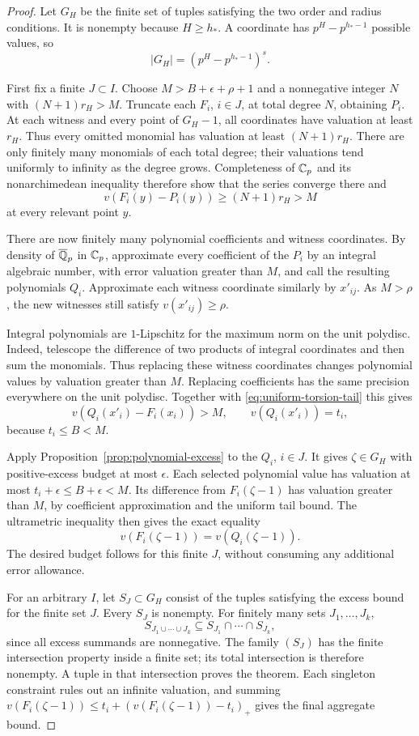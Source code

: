 \begin{proof}
Let $G_H$ be the finite set of tuples satisfying the two order and radius
conditions. It is nonempty because $H\ge h_*$. A coordinate has
$p^H-p^{h_*-1}$ possible values, so
\[
 |G_H|=(p^H-p^{h_*-1})^s.
\]

First fix a finite $J\subset I$. Choose
$M>B+\epsilon+\rho+1$ and a nonnegative integer $N$ with
$(N+1)r_H>M$. Truncate each $F_i$, $i\in J$, at total degree $N$,
obtaining $P_i$. At each witness and every point of $G_H-1$, all
coordinates have valuation at least $r_H$. Thus every omitted
monomial has valuation at least $(N+1)r_H$. There are only finitely
many monomials of each total degree; their valuations tend uniformly
to infinity as the degree grows. Completeness of $\mathbb C_p$ and its
nonarchimedean inequality therefore show that the series converge
there and
\begin{equation}
\label{eq:uniform-torsion-tail}
 v(F_i(y)-P_i(y))\ge(N+1)r_H>M
\end{equation}
at every relevant point $y$.

There are now finitely many polynomial coefficients and witness
coordinates. By density of $\overline{\mathbb Q}_p$ in $\mathbb C_p$, approximate
every coefficient of the $P_i$ by an integral algebraic number, with
error valuation greater than $M$, and call the resulting polynomials
$Q_i$. Approximate each witness coordinate similarly by $x'_{ij}$.
As $M>\rho$, the new witnesses still satisfy $v(x'_{ij})\ge\rho$.

Integral polynomials are $1$-Lipschitz for the maximum norm on the unit
polydisc. Indeed, telescope the difference of two products of integral
coordinates and then sum the monomials. Thus replacing these witness
coordinates changes polynomial values by valuation greater than $M$.
Replacing coefficients has the same precision everywhere on the
unit polydisc. Together with \eqref{eq:uniform-torsion-tail} this gives
\[
 v(Q_i(x'_i)-F_i(x_i))>M,
 \qquad v(Q_i(x'_i))=t_i,
\]
because $t_i\le B<M$.

Apply Proposition~\ref{prop:polynomial-excess} to the $Q_i$, $i\in J$.
It gives $\zeta\in G_H$ with positive-excess budget at most $\epsilon$.
Each selected polynomial value has valuation at most
$t_i+\epsilon\le B+\epsilon<M$. Its difference from
$F_i(\zeta-1)$ has valuation greater than $M$, by coefficient
approximation and the uniform tail bound. The ultrametric inequality
then gives the exact equality
\[
 v(F_i(\zeta-1))=v(Q_i(\zeta-1)).
\]
The desired budget follows for this finite $J$, without consuming any
additional error allowance.

For an arbitrary $I$, let $S_J\subset G_H$ consist of the tuples
satisfying the excess bound for the finite set $J$. Every $S_J$ is
nonempty. For finitely many sets $J_1,\ldots,J_k$,
\[
 S_{J_1\cup\cdots\cup J_k}\subseteq
 S_{J_1}\cap\cdots\cap S_{J_k},
\]
since all excess summands are nonnegative. The family $(S_J)$ has the
finite intersection property inside a finite set; its total
intersection is therefore nonempty. A tuple in that intersection
proves the theorem. Each singleton constraint rules out an infinite
valuation, and summing $v(F_i(\zeta-1))\le
t_i+(v(F_i(\zeta-1))-t_i)_+$ gives the final aggregate bound.
\end{proof}
